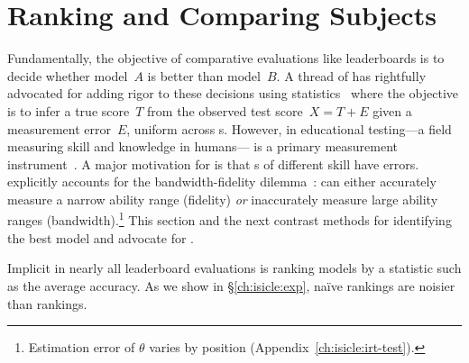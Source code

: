 \section{Ranking and Comparing Subjects}
\label{ch:isicle:compare}


Fundamentally, the objective of comparative evaluations like
leaderboards is to decide whether model~$A$ is better than model~$B$.
%
A thread of \nlp{} has rightfully advocated for adding rigor to these
decisions using statistics~\citep[Classical Testing
  Theory]{traub1997ctt} where the objective is to infer a true
score~$T$ from the observed test score~$X=T+E$ given a measurement
error~$E$, uniform across \subj{}s.
%
However, in educational testing---a field measuring skill and
knowledge in humans---\irt{} is a primary measurement
instrument~\citep[p.~2]{hambleton1991fundamentals}.
%
A major motivation for \irt{} is that \subj{}s of different skill have
 errors.
\irt{} explicitly accounts for the bandwidth-fidelity
dilemma~\citep{mcbride1976bandwidth}: \itms{} can either accurately
measure a narrow ability range (fidelity) \textit{or} inaccurately
measure large ability ranges (bandwidth).\footnote{Estimation error
  of $\theta$ varies by position (Appendix~\ref{ch:isicle:irt-test}).  }
%
This section and the next contrast methods for identifying the best
model and advocate for \irt{}.

\label{ch:isicle:agg}


Implicit in nearly all leaderboard evaluations is ranking models by a
statistic such as the average accuracy.
As we show in \S\ref{ch:isicle:exp}, na\"ive rankings are noisier than \irt{} rankings.
